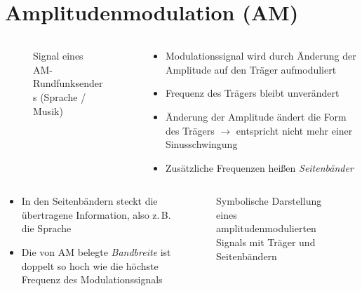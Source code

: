 
\section{Amplitudenmodulation (AM)}
\label{section:am}
\begin{frame}%

\begin{columns}
    \begin{column}{0.48\textwidth}
    
\begin{figure}
    \caption{\scriptsize Signal eines AM-Rundfunksenders (Sprache / Musik)}
    \label{n_Wasserfall0}
\end{figure}


    \end{column}
   \begin{column}{0.48\textwidth}
       \begin{itemize}
  \item Modulationssignal wird durch Änderung der Amplitude auf den Träger aufmoduliert
  \item Frequenz des Trägers bleibt unverändert
  \item Änderung der Amplitude ändert die Form des Trägers $\rightarrow$ entspricht nicht mehr einer Sinusschwingung
  \item Zusätzliche Frequenzen heißen \emph{Seitenbänder}
  \end{itemize}

   \end{column}
\end{columns}

\end{frame}

\begin{frame}
\begin{columns}
    \begin{column}{0.48\textwidth}
    \begin{itemize}
  \item In den Seitenbändern steckt die übertragene Information, also z.\,B. die Sprache
  \item Die von AM belegte \emph{Bandbreite} ist doppelt so hoch wie die höchste Frequenz des Modulationssignals
  \end{itemize}

    \end{column}
   \begin{column}{0.48\textwidth}
       
\begin{figure}
    \caption{\scriptsize Symbolische Darstellung eines amplitudenmodulierten Signals mit Träger und Seitenbändern}
    \label{n_seitenband}
\end{figure}


   \end{column}
\end{columns}

\end{frame}

